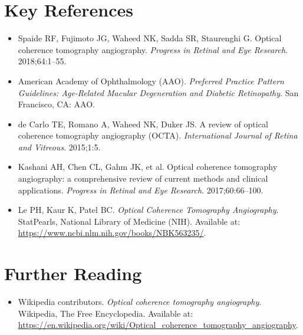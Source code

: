 \section{Key References}
\begin{itemize}
\item Spaide RF, Fujimoto JG, Waheed NK, Sadda SR, Staurenghi G. Optical coherence tomography angiography. \textit{Progress in Retinal and Eye Research}. 2018;64:1--55.
\item American Academy of Ophthalmology (AAO). \textit{Preferred Practice Pattern Guidelines: Age-Related Macular Degeneration and Diabetic Retinopathy}. San Francisco, CA: AAO.
\item de Carlo TE, Romano A, Waheed NK, Duker JS. A review of optical coherence tomography angiography (OCTA). \textit{International Journal of Retina and Vitreous}. 2015;1:5.
\item Kashani AH, Chen CL, Gahm JK, et al. Optical coherence tomography angiography: a comprehensive review of current methods and clinical applications. \textit{Progress in Retinal and Eye Research}. 2017;60:66--100.
\item Le PH, Kaur K, Patel BC. \textit{Optical Coherence Tomography Angiography}. StatPearls, National Library of Medicine (NIH). Available at: \url{https://www.ncbi.nlm.nih.gov/books/NBK563235/}.
\end{itemize}

\section{Further Reading}
\begin{itemize}
  \item Wikipedia contributors. \textit{Optical coherence tomography angiography}. Wikipedia, The Free Encyclopedia. Available at: \url{https://en.wikipedia.org/wiki/Optical_coherence_tomography_angiography}.
\end{itemize}
